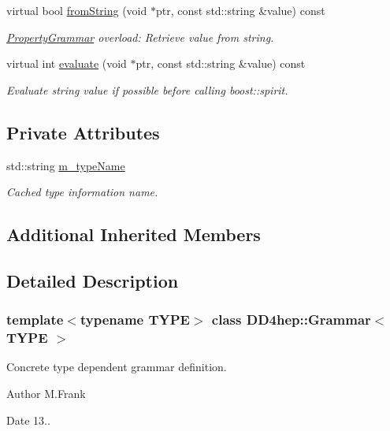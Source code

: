 \begin{DoxyCompactItemize}
virtual bool \hyperlink{class_d_d4hep_1_1_grammar_abf8d2ed7d9958d657a91ec69fa103df7}{from\+String} (void $\ast$ptr, const std\+::string \&value) const
\begin{DoxyCompactList}\small\item\em \hyperlink{class_d_d4hep_1_1_property_grammar}{Property\+Grammar} overload\+: Retrieve value from string. \end{DoxyCompactList}\item 
virtual int \hyperlink{class_d_d4hep_1_1_grammar_abdcdd993a4fda6a2bc4aab922e27f355}{evaluate} (void $\ast$ptr, const std\+::string \&value) const
\begin{DoxyCompactList}\small\item\em Evaluate string value if possible before calling boost\+::spirit. \end{DoxyCompactList}\end{DoxyCompactItemize}
\subsection*{Private Attributes}
\begin{DoxyCompactItemize}
\item 
std\+::string \hyperlink{class_d_d4hep_1_1_grammar_a10842e3b2f4549f2f8f2b0306e17a43d}{m\+\_\+type\+Name}
\begin{DoxyCompactList}\small\item\em Cached type information name. \end{DoxyCompactList}\end{DoxyCompactItemize}
\subsection*{Additional Inherited Members}


\subsection{Detailed Description}
\subsubsection*{template$<$typename T\+Y\+PE$>$\newline
class D\+D4hep\+::\+Grammar$<$ T\+Y\+P\+E $>$}

Concrete type dependent grammar definition. 

\begin{DoxyAuthor}{Author}
M.\+Frank 
\end{DoxyAuthor}
\begin{DoxyDate}{Date}
13.. 
\end{DoxyDate}


